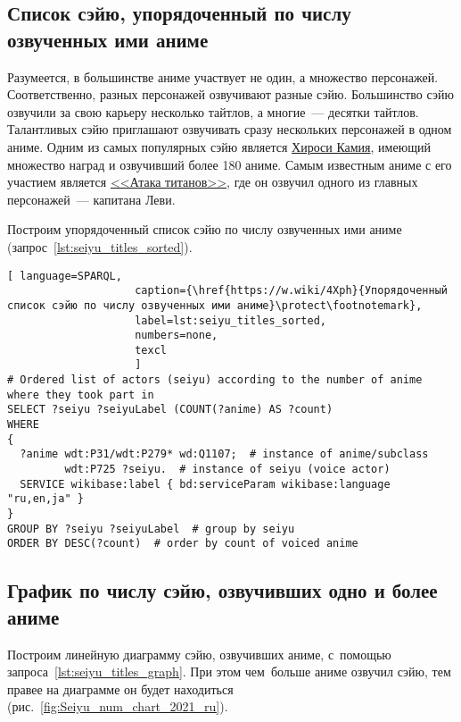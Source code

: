 \subsection{Список сэйю, упорядоченный по числу озвученных ими аниме}

Разумеется, в большинстве аниме участвует не один, а множество персонажей. 
Соответственно, разных персонажей озвучивают разные сэйю. 
Большинство сэйю озвучили за свою карьеру несколько тайтлов, 
а многие~--- десятки тайтлов. 
Талантливых сэйю приглашают озвучивать сразу нескольких персонажей в одном аниме. Одним из самых популярных сэйю является \href{https://w.wiki/4L5q}{Хироси Камия}, имеющий множество наград и озвучивший более 180 аниме. Самым известным аниме с его участием является \href{https://w.wiki/4L5r}{<<Атака титанов>>}, где он озвучил одного из главных персонажей~--- капитана Леви.

Построим упорядоченный список сэйю по числу озвученных ими аниме (запрос~\ref{lst:seiyu_titles_sorted}).

\newpage
\begin{lstlisting}[ language=SPARQL, 
                    caption={\href{https://w.wiki/4Xph}{Упорядоченный список сэйю по числу озвученных ими аниме}\protect\footnotemark},
                    label=lst:seiyu_titles_sorted,
                    numbers=none,
                    texcl 
                    ]
# Ordered list of actors (seiyu) according to the number of anime where they took part in
SELECT ?seiyu ?seiyuLabel (COUNT(?anime) AS ?count)
WHERE
{
  ?anime wdt:P31/wdt:P279* wd:Q1107;  # instance of anime/subclass
         wdt:P725 ?seiyu.  # instance of seiyu (voice actor)
  SERVICE wikibase:label { bd:serviceParam wikibase:language "ru,en,ja" }
}
GROUP BY ?seiyu ?seiyuLabel  # group by seiyu 
ORDER BY DESC(?count)  # order by count of voiced anime
\end{lstlisting}%



\subsection{График по числу сэйю, озвучивших одно и более аниме}

Построим линейную диаграмму сэйю, озвучивших аниме, с~помощью запроса~\ref{lst:seiyu_titles_graph}. 
При этом чем~больше аниме озвучил сэйю, тем правее на диаграмме он будет находиться (рис.~\ref{fig:Seiyu_num_chart_2021_ru}). 

